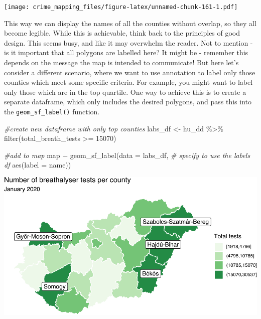 \documentclass[
  krantz2]{krantz}
\makeatletter
\newenvironment{Shaded}{\begin{snugshade}}{\end{snugshade}}
\newcommand{\AttributeTok}[1]{\textcolor[rgb]{0.61,0.61,0.61}{#1}}
\newcommand{\CommentTok}[1]{\textcolor[rgb]{0.37,0.37,0.37}{\textit{#1}}}
\newcommand{\DecValTok}[1]{\textcolor[rgb]{0.06,0.06,0.06}{#1}}
\newcommand{\FunctionTok}[1]{\textcolor[rgb]{0,0,0}{#1}}
\newcommand{\NormalTok}[1]{#1}
\newcommand{\OtherTok}[1]{\textcolor[rgb]{0.37,0.37,0.37}{#1}}
\newcommand{\SpecialCharTok}[1]{\textcolor[rgb]{0,0,0}{#1}}
\newenvironment{kframe}{%
\medskip{}
\setlength{\fboxsep}{.8em}
 \def\at@end@of@kframe{}%
 \ifinner\ifhmode%
  \def\at@end@of@kframe{\end{minipage}}%
  \begin{minipage}{\columnwidth}%
 \fi\fi%
 \def\FrameCommand##1{\hskip\@totalleftmargin \hskip-\fboxsep
 \colorbox{shadecolor}{##1}\hskip-\fboxsep
     \hskip-\linewidth \hskip-\@totalleftmargin \hskip\columnwidth}%
 \MakeFramed {\advance\hsize-\width
   \@totalleftmargin\z@ \linewidth\hsize
   \@setminipage}}%
 {\par\unskip\endMakeFramed%
 \at@end@of@kframe}
\renewenvironment{Shaded}{\begin{kframe}}{\end{kframe}}
\makeatother
\begin{document}
\texttt{[image: crime\_mapping\_files/figure-latex/unnamed-chunk-161-1.pdf]}

This way we can display the names of all the counties without overlap, so they all become legible. While this is achievable, think back to the principles of good design. This seems busy, and like it may overwhelm the reader. Not to mention - is it important that all polygons are labelled here? It might be - remember this depends on the message the map is intended to communicate! But here let's consider a different scenario, where we want to use annotation to label only those counties which meet some specific criteria. For example, you might want to label only those which are in the top quartile. One way to achieve this is to create a separate dataframe, which only includes the desired polygons, and pass this into the \texttt{geom\_sf\_label()} function.

\begin{Shaded}
\begin{Highlighting}[]
\CommentTok{\#create new dataframe with only top counties}
\NormalTok{labs\_df }\OtherTok{\textless{}{-}}\NormalTok{ hu\_dd }\SpecialCharTok{\%\textgreater{}\%} \FunctionTok{filter}\NormalTok{(total\_breath\_tests }\SpecialCharTok{\textgreater{}=} \DecValTok{15070}\NormalTok{)}

\CommentTok{\#add to map}
\NormalTok{map }\SpecialCharTok{+} 
  \FunctionTok{geom\_sf\_label}\NormalTok{(}\AttributeTok{data =}\NormalTok{ labs\_df, }\CommentTok{\# specify to use the labels df}
                \FunctionTok{aes}\NormalTok{(}\AttributeTok{label =}\NormalTok{ name)) }
\end{Highlighting}
\end{Shaded}

\includegraphics{crime_mapping_files/figure-latex/addcountynamestoponly-1.pdf}
\end{document}
